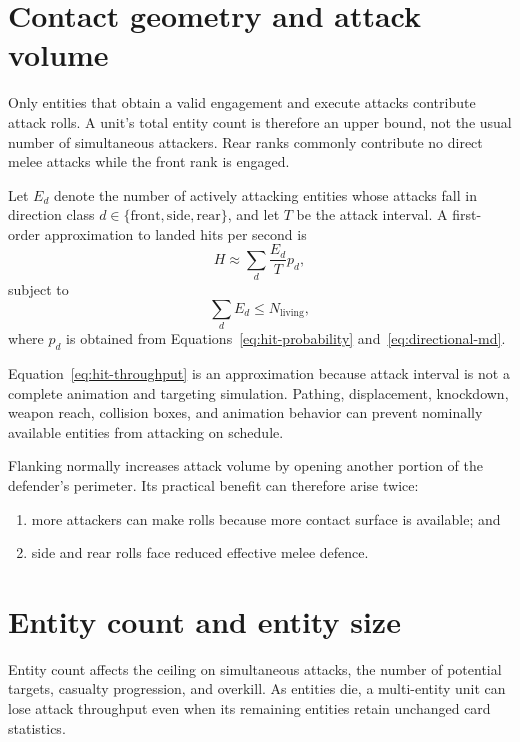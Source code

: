 \documentclass[11pt]{article}
\begin{document}
\section{Contact geometry and attack volume}

Only entities that obtain a valid engagement and execute attacks contribute
attack rolls.  A unit's total entity count is therefore an upper bound, not
the usual number of simultaneous attackers.  Rear ranks commonly contribute
no direct melee attacks while the front rank is engaged.

Let $E_d$ denote the number of actively attacking entities whose attacks fall
in direction class $d \in \{\mathrm{front},\mathrm{side},\mathrm{rear}\}$,
and let $T$ be the attack interval.  A first-order approximation to landed
hits per second is
\begin{equation}
  H \approx
  \sum_d \frac{E_d}{T} p_d,
  \label{eq:hit-throughput}
\end{equation}
subject to
\begin{equation}
  \sum_d E_d \leq N_{\mathrm{living}},
\end{equation}
where $p_d$ is obtained from Equations~\ref{eq:hit-probability}
and~\ref{eq:directional-md}.

Equation~\ref{eq:hit-throughput} is an approximation because attack interval
is not a complete animation and targeting simulation.  Pathing, displacement,
knockdown, weapon reach, collision boxes, and animation behavior can prevent
nominally available entities from attacking on schedule.

Flanking normally increases attack volume by opening another portion of the
defender's perimeter.  Its practical benefit can therefore arise twice:
\begin{enumerate}
  \item more attackers can make rolls because more contact surface is
        available; and
  \item side and rear rolls face reduced effective melee defence.
\end{enumerate}

\section{Entity count and entity size}

Entity count affects the ceiling on simultaneous attacks, the number of
potential targets, casualty progression, and overkill.  As entities die, a
multi-entity unit can lose attack throughput even when its remaining entities
retain unchanged card statistics.
\end{document}
